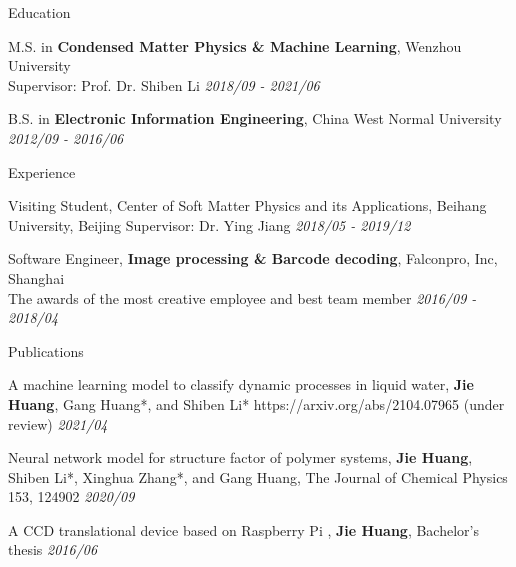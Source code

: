 \documentclass{resume} %
\begin{document}
\begin{rSection}{Education}
\begin{rSubsection}{}{}{}{}
\item M.S. in \textbf{Condensed Matter Physics \& Machine Learning}, Wenzhou University \\ Supervisor: Prof. Dr. Shiben Li \hfill \textit{2018/09 - 2021/06} 
\item B.S. in \textbf{Electronic Information Engineering}, China West Normal University \hfill \textit{2012/09 - 2016/06}
\end{rSubsection}
\end{rSection}


\begin{rSection}{Experience}
\begin{rSubsection}{}{}{}{}
\item Visiting Student, Center of Soft Matter Physics and its Applications, Beihang University, Beijing Supervisor: Dr. Ying Jiang \hfill\textit{2018/05 - 2019/12} 
\item Software Engineer, \textbf{Image processing \& Barcode decoding}, Falconpro, Inc, Shanghai \\ The awards of the most creative employee and best team member \hfill \textit{2016/09 - 2018/04}  
\end{rSubsection}
\end{rSection}



\begin{rSection}{Publications}
\begin{rSubsection}{}{}{}{}
\item A machine learning model to classify dynamic processes in liquid water, \textbf{Jie Huang}, Gang Huang*, and Shiben Li*  https://arxiv.org/abs/2104.07965 (under review) \hfill \textit{2021/04}
\item Neural network model for structure factor of polymer systems, \textbf{Jie Huang}, Shiben Li*, Xinghua Zhang*, and Gang Huang, The Journal of Chemical Physics 153, 124902  \hfill \textit{2020/09}
\item A CCD translational device based on Raspberry Pi , \textbf{Jie Huang}, Bachelor's thesis \hfill \textit{2016/06}
\end{rSubsection}
\end{rSection}
\end{document}
